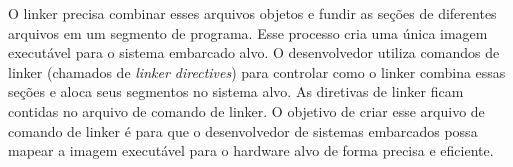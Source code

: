 




O linker precisa combinar esses arquivos objetos e fundir as seções de diferentes arquivos em um segmento de programa. Esse processo cria uma única imagem executável para o sistema embarcado alvo. O desenvolvedor utiliza comandos de linker (chamados de \textit{linker directives}) para controlar como o linker combina essas seções e aloca seus segmentos no sistema alvo. As diretivas de linker ficam contidas no arquivo de comando de linker. O objetivo de criar esse arquivo de comando de linker é para que o desenvolvedor de sistemas embarcados possa mapear a imagem executável para o hardware alvo de forma precisa e eficiente. 

